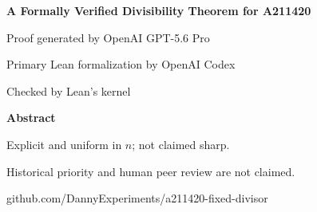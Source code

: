 \documentclass{article}
\begin{document}
\thispagestyle{empty}

\noindent
{}

\vspace{-0.02in}

\begin{center}
{\bfseries\fontsize{28}{33}\selectfont
A Formally Verified Divisibility Theorem for A211420\par}

\vspace{0.10in}

{\fontsize{13.5}{17}\selectfont
Proof generated by OpenAI GPT-5.6 Pro\par
Primary Lean formalization by OpenAI Codex\par
Checked by Lean's kernel\par}

\vspace{0.13in}

{\bfseries\fontsize{19}{22}\selectfont Abstract\par}
\end{center}

\vspace{-0.03in}

\noindent\hfill
\begin{minipage}{0.92\textwidth}
\fontsize{17.2}{22.2}\selectfont

\end{minipage}
\hfill\mbox{}

\vfill

\noindent
\begin{minipage}[b]{0.58\textwidth}
\raggedright
\fontsize{12.5}{15}\selectfont
Explicit and uniform in $n$; not claimed sharp.\par
Historical priority and human peer review are not claimed.
\end{minipage}%
\hfill
\begin{minipage}[b]{0.40\textwidth}
\raggedleft
\sffamily\fontsize{12.5}{15}\selectfont
github.com/DannyExperiments/a211420-fixed-divisor
\end{minipage}
\end{document}
